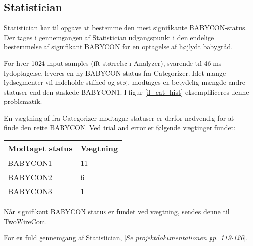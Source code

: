 \subsection{Statistician}

Statistician har til opgave at bestemme den mest signifikante BABYCON-status. Der tages i gennemgangen af Statistician udgangspunkt i den endelige bestemmelse af signifikant BABYCON for en optagelse af højlydt babygråd.
 
For hver 1024 input samples (fft-størrelse i Analyzer), svarende til 46 ms lydoptagelse, leveres en ny BABYCON status fra Categorizer. Idet mange lydsegmenter vil indeholde stilhed og støj, modtages en betydelig mængde andre statuser end den ønskede BABYCON1. I figur \ref{il_cat_hist} eksemplificeres denne problematik.


En vægtning af fra Categorizer modtagne statuser er derfor nødvendig for at finde den rette BABYCON. Ved trial and error er følgende vægtinger fundet:
\begin{center}
    \begin{tabular}{ | l | l |}
    \hline
    \textbf{Modtaget status}	& \textbf{Vægtning}		\\ \hline
    BABYCON1							& 11					\\ \hline
    BABYCON2							& 6						\\ \hline
    BABYCON3							& 1						\\ \hline   
    \end{tabular}
\end{center}

Når signifikant BABYCON status er fundet ved vægtning, sendes denne til TwoWireCom.

For en fuld gennemgang af Statistician, [\textit{Se projektdokumentationen pp. 119-120}].
